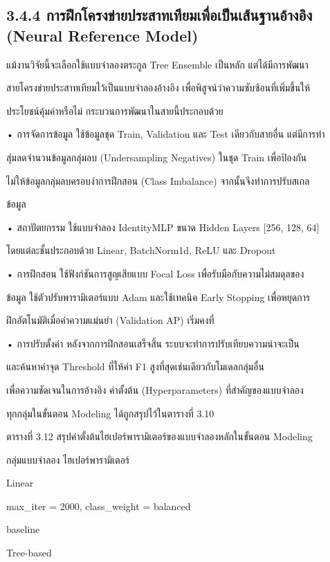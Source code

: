 \documentclass[12pt,a4paper]{report}
\begin{document}
\subsection*{3.4.4 การฝึกโครงข่ายประสาทเทียมเพื่อเป็นเส้นฐานอ้างอิง (Neural Reference Model)}
แม้งานวิจัยนี้จะเลือกใช้แบบจำลองตระกูล Tree Ensemble เป็นหลัก แต่ได้มีการพัฒนา\par
สายโครงข่ายประสาทเทียมไว้เป็นแบบจำลองอ้างอิง เพื่อพิสูจน์ว่าความซับซ้อนที่เพิ่มขึ้นให้\par
ประโยชน์คุ้มค่าหรือไม่ กระบวนการพัฒนาในสายนี้ประกอบด้วย\par
\noindent • การจัดการข้อมูล ใช้ข้อมูลชุด Train, Validation และ Test เดียวกับสายอื่น แต่มีการทำ\par
สุ่มลดจำนวนข้อมูลกลุ่มลบ (Undersampling Negatives) ในชุด Train เพื่อป้องกัน\par
ไม่ให้ข้อมูลกลุ่มลบครอบงำการฝึกสอน (Class Imbalance) จากนั้นจึงทำการปรับสเกล\par
ข้อมูล\par
\clearpage
\noindent • สถาปัตยกรรม ใช้แบบจำลอง IdentityMLP ขนาด Hidden Layers [256, 128, 64]\par
โดยแต่ละชั้นประกอบด้วย Linear, BatchNorm1d, ReLU และ Dropout\par
\noindent • การฝึกสอน ใช้ฟังก์ชันการสูญเสียแบบ Focal Loss เพื่อรับมือกับความไม่สมดุลของ\par
ข้อมูล ใช้ตัวปรับพารามิเตอร์แบบ Adam และใช้เทคนิค Early Stopping เพื่อหยุดการ\par
ฝึกอัตโนมัติเมื่อค่าความแม่นยำ (Validation AP) เริ่มคงที่\par
\noindent • การปรับตั้งค่า หลังจากการฝึกสอนเสร็จสิ้น ระบบจะทำการปรับเทียบความน่าจะเป็น\par
และค้นหาค่าจุด Threshold ที่ให้ค่า F1 สูงที่สุดเช่นเดียวกับโมเดลกลุ่มอื่น\par
เพื่อความชัดเจนในการอ้างอิง ค่าตั้งต้น (Hyperparameters) ที่สำคัญของแบบจำลอง\par
ทุกกลุ่มในขั้นตอน Modeling ได้ถูกสรุปไว้ในตารางที่ 3.10\par
\begin{center}\small ตารางที่ 3.12 สรุปค่าตั้งต้นไฮเปอร์พารามิเตอร์ของแบบจำลองหลักในขั้นตอน Modeling\end{center}
กลุ่มแบบจำลอง ไฮเปอร์พารามิเตอร์\par
Linear\par
max\_iter = 2000, class\_weight = balanced\par
baseline\par
Tree-based\par
\end{document}
